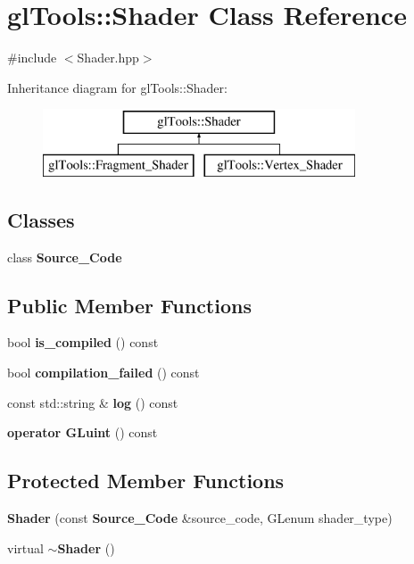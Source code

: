 \section{gl\+Tools\+::Shader Class Reference}
\label{classgl_tools_1_1_shader}


{\ttfamily \#include $<$Shader.\+hpp$>$}

Inheritance diagram for gl\+Tools\+::Shader\+:\begin{figure}[H]
\begin{center}
\leavevmode
\includegraphics[height=2.000000cm]{classgl_tools_1_1_shader}
\end{center}
\end{figure}
\subsection*{Classes}
\begin{DoxyCompactItemize}
\item 
class \textbf{ Source\+\_\+\+Code}
\end{DoxyCompactItemize}
\subsection*{Public Member Functions}
\begin{DoxyCompactItemize}
\item 
bool \textbf{ is\+\_\+compiled} () const
\item 
bool \textbf{ compilation\+\_\+failed} () const
\item 
const std\+::string \& \textbf{ log} () const
\item 
\textbf{ operator G\+Luint} () const
\end{DoxyCompactItemize}
\subsection*{Protected Member Functions}
\begin{DoxyCompactItemize}
\item 
\textbf{ Shader} (const \textbf{ Source\+\_\+\+Code} \&source\+\_\+code, G\+Lenum shader\+\_\+type)
\item 
virtual \textbf{ $\sim$\+Shader} ()
\end{DoxyCompactItemize}


